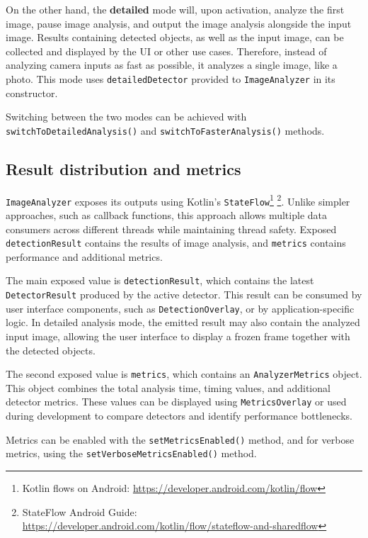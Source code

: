 On the other hand, the \textbf{detailed} mode will, upon activation, analyze the first image, pause image analysis, and output the image analysis alongside the input image. Results containing detected objects, as well as the input image, can be collected and displayed by the UI or other use cases. Therefore, instead of analyzing camera inputs as fast as possible, it analyzes a single image, like a photo. This mode uses \texttt{detailedDetector} provided to \texttt{ImageAnalyzer} in its constructor.

Switching between the two modes can be achieved with \texttt{switchToDetailedAnalysis()} and \texttt{switchToFasterAnalysis()} methods.

\subsection{Result distribution and metrics}
\texttt{ImageAnalyzer} exposes its outputs using Kotlin's \texttt{StateFlow}\footnote{Kotlin flows on Android: \url{https://developer.android.com/kotlin/flow}} \footnote{StateFlow Android Guide: \url{https://developer.android.com/kotlin/flow/stateflow-and-sharedflow}}. Unlike simpler approaches, such as callback functions, this approach allows multiple data consumers across different threads while maintaining thread safety. Exposed \texttt{detectionResult} contains the results of image analysis, and \texttt{metrics} contains performance and additional metrics. 

The main exposed value is \texttt{detectionResult}, which contains the latest \texttt{DetectorResult} produced by the active detector. This result can be consumed by user interface components, such as \texttt{DetectionOverlay}, or by application-specific logic. In detailed analysis mode, the emitted result may also contain the analyzed input image, allowing the user interface to display a frozen frame together with the detected objects.

The second exposed value is \texttt{metrics}, which contains an \texttt{AnalyzerMetrics} object. This object combines the total analysis time, timing values, and additional detector metrics. These values can be displayed using \texttt{MetricsOverlay} or used during development to compare detectors and identify performance bottlenecks.

Metrics can be enabled with the \texttt{setMetricsEnabled()} method, and for verbose metrics, using the \texttt{setVerboseMetricsEnabled()} method.

